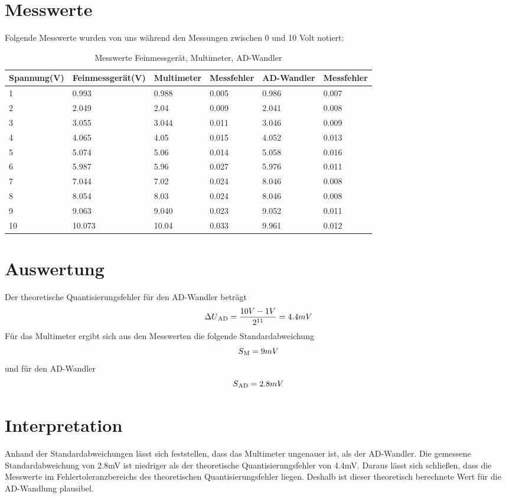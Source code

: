 \documentclass[12pt, oneside, a4paper, \docLanguage]{report}
\begin{document}
\section{Messwerte}
\label{chap:VERSUCH_2_MESSWERTE}
Folgende Messwerte wurden von uns während den Messungen zwischen 0 und 10 Volt notiert:
\begin{table}[H]
	\begin{tabular}{l|l|l|l|l|l}
		Spannung(V) & Feinmessgerät(V) & Multimeter & Messfehler & AD-Wandler & Messfehler\\
		\hline
		1 & 0.993 & 0.988 & 0.005 & 0.986 & 0.007\\
		2 & 2.049 & 2.04 & 0.009 & 2.041 & 0.008\\
		3 & 3.055 & 3.044 & 0.011 & 3.046 & 0.009\\ 
		4 & 4.065 & 4.05 & 0.015 & 4.052 & 0.013\\
		5 & 5.074 & 5.06 & 0.014 & 5.058 & 0.016\\
		6 & 5.987 & 5.96 & 0.027 & 5.976 & 0.011\\ 
		7 & 7.044 & 7.02 & 0.024 & 8.046 & 0.008\\
		8 & 8.054 & 8.03 & 0.024 & 8.046 & 0.008\\
		9 & 9.063 & 9.040 & 0.023 & 9.052 & 0.011\\
		10 & 10.073 & 10.04 & 0.033 & 9.961 & 0.012\\
	\end{tabular}
	\caption{Messwerte Feinmessgerät, Multimeter, AD-Wandler}
	\label{MWADWANDLER}
\end{table}

\section{Auswertung}
\label{chap:VERSUCH_2_AUSWERTUNG}
Der theoretische Quantisierungsfehler für den AD-Wandler beträgt
\begin{equation}
\Delta U\textsubscript{AD} = \frac{10V - 1V}{2\textsuperscript{11}} = 4.4mV
\end{equation}
Für das Multimeter ergibt sich aus den Messwerten die folgende Standardabweichung
\begin{equation}
S\textsubscript{M} = 9mV
\end{equation}
und für den AD-Wandler
\begin{equation}
S\textsubscript{AD} = 2.8mV
\end{equation}
\newpage
\section{Interpretation}
\label{chap:VERSUCH_2_INTERPRETATION}
Anhand der Standardabweichungen lässt sich feststellen, dass das Multimeter ungenauer ist, als der AD-Wandler. Die gemessene Standardabweichung von 2.8mV ist niedriger als der theoretische Quantisierungsfehler von 4.4mV. Daraus lässt sich schließen, dass die Messwerte im Fehlertoleranzbereichs des theoretischen Quantisierungsfehler liegen. Deshalb ist dieser theoretisch berechnete Wert für die AD-Wandlung plausibel.
\end{document}
